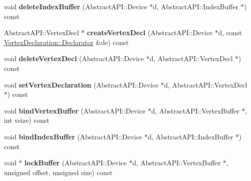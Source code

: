 \begin{DoxyCompactItemize}
\item 
\hypertarget{class_tempest_1_1_opengl2x_ab27fb3f2de4a55c990af370adf56d026}{void {\bfseries delete\+Index\+Buffer} (Abstract\+A\+P\+I\+::\+Device $\ast$d, Abstract\+A\+P\+I\+::\+Index\+Buffer $\ast$) const }\label{class_tempest_1_1_opengl2x_ab27fb3f2de4a55c990af370adf56d026}

\item 
\hypertarget{class_tempest_1_1_opengl2x_ab11c447faaac773084b2a439f817027b}{Abstract\+A\+P\+I\+::\+Vertex\+Decl $\ast$ {\bfseries create\+Vertex\+Decl} (Abstract\+A\+P\+I\+::\+Device $\ast$d, const \hyperlink{class_tempest_1_1_vertex_declaration_1_1_declarator}{Vertex\+Declaration\+::\+Declarator} \&de) const }\label{class_tempest_1_1_opengl2x_ab11c447faaac773084b2a439f817027b}

\item 
\hypertarget{class_tempest_1_1_opengl2x_af0ad8995ff3f07c11df7f8d2e3afbf8a}{void {\bfseries delete\+Vertex\+Decl} (Abstract\+A\+P\+I\+::\+Device $\ast$d, Abstract\+A\+P\+I\+::\+Vertex\+Decl $\ast$) const }\label{class_tempest_1_1_opengl2x_af0ad8995ff3f07c11df7f8d2e3afbf8a}

\item 
\hypertarget{class_tempest_1_1_opengl2x_abaf73a0178112a535f8862879276baa8}{void {\bfseries set\+Vertex\+Declaration} (Abstract\+A\+P\+I\+::\+Device $\ast$d, Abstract\+A\+P\+I\+::\+Vertex\+Decl $\ast$) const }\label{class_tempest_1_1_opengl2x_abaf73a0178112a535f8862879276baa8}

\item 
\hypertarget{class_tempest_1_1_opengl2x_a677cd6dfbfe906e7c4452a61f39072d8}{void {\bfseries bind\+Vertex\+Buffer} (Abstract\+A\+P\+I\+::\+Device $\ast$d, Abstract\+A\+P\+I\+::\+Vertex\+Buffer $\ast$, int vsize) const }\label{class_tempest_1_1_opengl2x_a677cd6dfbfe906e7c4452a61f39072d8}

\item 
\hypertarget{class_tempest_1_1_opengl2x_a8aab07e000dafe02b03e889aab58f435}{void {\bfseries bind\+Index\+Buffer} (Abstract\+A\+P\+I\+::\+Device $\ast$d, Abstract\+A\+P\+I\+::\+Index\+Buffer $\ast$) const }\label{class_tempest_1_1_opengl2x_a8aab07e000dafe02b03e889aab58f435}

\item 
\hypertarget{class_tempest_1_1_opengl2x_af4dddc370c0e282a2412a68460c067d8}{void $\ast$ {\bfseries lock\+Buffer} (Abstract\+A\+P\+I\+::\+Device $\ast$d, Abstract\+A\+P\+I\+::\+Vertex\+Buffer $\ast$, unsigned offset, unsigned size) const }\label{class_tempest_1_1_opengl2x_af4dddc370c0e282a2412a68460c067d8}


\end{DoxyCompactItemize}
